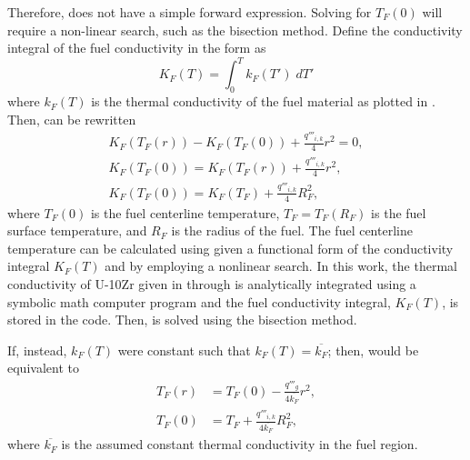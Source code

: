       Therefore,  does not have a simple forward
      expression. Solving for $T_F(0)$ will require a non-linear search, such as
      the bisection method. Define the conductivity integral of the fuel
      conductivity in the form as
      \begin{equation}
        \label{eq:conductivity_integral}
        K_F(T) = \int_0^T k_F(T') \; dT'
      \end{equation}
      where $k_F(T)$ is the thermal conductivity of the fuel material as plotted
      in . Then,  can be rewritten
      \begin{gather}
        K_F(T_F(r)) - K_F(T_F(0)) + \frac{q'''_{i,k}}{4} r^2 = 0, \\
        \label{eq:tfuel_r}
        K_F(T_F(0)) = K_F(T_F(r)) + \frac{q'''_{i,k}}{4} r^2, \\
        \label{eq:tcl_conductivity_integral}
        K_F(T_F(0)) = K_F(T_F) + \frac{q'''_{i,k}}{4} R_F^2,
      \end{gather}
      where $T_F(0)$ is the fuel centerline temperature, $T_F=T_F(R_F)$ is the
      fuel surface temperature, and $R_F$ is the radius of the fuel. The fuel
      centerline temperature can be calculated using
       given a functional form of the
      conductivity integral $K_F(T)$ and by employing a nonlinear search. In
      this work, the thermal conductivity of U-10Zr given in
       through  is analytically
      integrated using a symbolic math computer program and the fuel 
      conductivity integral, $K_F(T)$, is stored in the code. Then,
       is solved using the bisection method.

      If, instead, $k_F(T)$ were constant such that $k_F(T) = \overline{k_F}$;
      then,  would be equivalent to 
      \begin{align}
        \label{eq:tfr}
        T_F(r) &= T_F(0) - \frac{q'''_g}{4 \overline{k_F}} r^2, \\
        \label{eq:tcl_constant_kfuel}
        T_F(0) &= T_F + \frac{q'''_{i,k}}{4 \overline{k_F}} R_F^2,
      \end{align}
      where $\overline{k_F}$ is the assumed constant thermal conductivity in the 
      fuel region.

